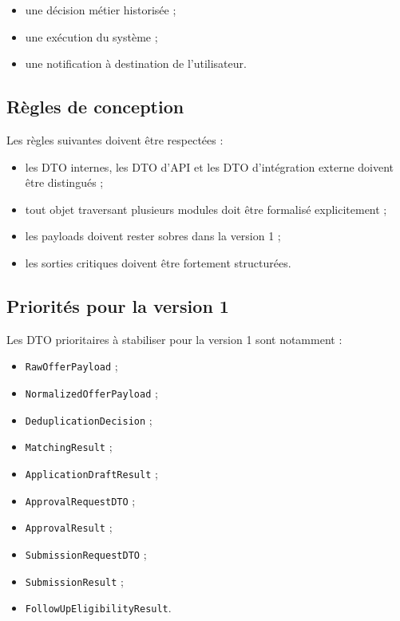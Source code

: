 \documentclass[11pt,a4paper]{article}
\begin{document}
\begin{itemize}
    \item une décision métier historisée ;
    \item une exécution du système ;
    \item une notification à destination de l’utilisateur.
\end{itemize}

\subsection{Règles de conception}

Les règles suivantes doivent être respectées :

\begin{itemize}
    \item les DTO internes, les DTO d’API et les DTO d’intégration externe doivent être distingués ;
    \item tout objet traversant plusieurs modules doit être formalisé explicitement ;
    \item les payloads doivent rester sobres dans la version 1 ;
    \item les sorties critiques doivent être fortement structurées.
\end{itemize}

\subsection{Priorités pour la version 1}

Les DTO prioritaires à stabiliser pour la version 1 sont notamment :

\begin{itemize}
    \item \texttt{RawOfferPayload} ;
    \item \texttt{NormalizedOfferPayload} ;
    \item \texttt{DeduplicationDecision} ;
    \item \texttt{MatchingResult} ;
    \item \texttt{ApplicationDraftResult} ;
    \item \texttt{ApprovalRequestDTO} ;
    \item \texttt{ApprovalResult} ;
    \item \texttt{SubmissionRequestDTO} ;
    \item \texttt{SubmissionResult} ;
    \item \texttt{FollowUpEligibilityResult}.
\end{itemize}
\end{document}
